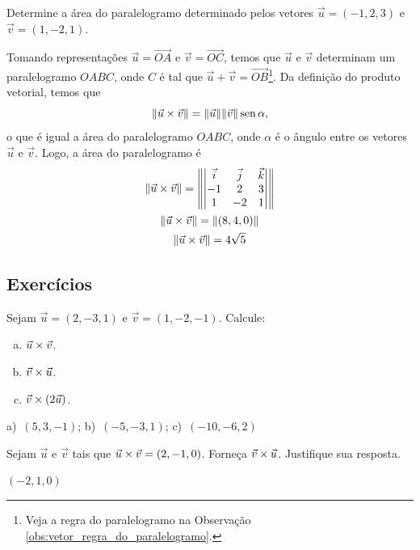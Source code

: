 \begin{exeresol}
  Determine a área do paralelogramo determinado pelos vetores $\vec{u} = (-1, 2, 3)$ e $\vec{v} = (1,-2,1)$.
\end{exeresol}
\begin{resol}
  Tomando representações $\vec{u}=\overrightarrow{OA}$ e $\vec{v}=\overrightarrow{OC}$, temos que $\vec{u}$ e $\vec{v}$ determinam um paralelogramo $OABC$, onde $C$ é tal que $\vec{u}+\vec{v}=\overrightarrow{OB}$\footnote{Veja a regra do paralelogramo na Observação \ref{obs:vetor_regra_do_paralelogramo}.}. Da definição do produto vetorial, temos que
  \begin{equation}
    \|\vec{u}\times\vec{v}\| = \|\vec{u}\|\|\vec{v}\|\operatorname{sen}\alpha,
  \end{equation}
  o que é igual a área do paralelogramo $OABC$, onde $\alpha$ é o ângulo entre os vetores $\vec{u}$ e $\vec{v}$. Logo, a área do paralelogramo é
  \begin{gather}
    \|\vec{u}\times\vec{v}\| =
    \left\|\begin{vmatrix}
      \vec{i} & \vec{j} & \vec{k} \\
      -1 & 2 & 3 \\
      1 & -2 & 1
    \end{vmatrix}\right\|\\
    \|\vec{u}\times\vec{v}\| = \|(8,4,0)\|\\
    \|\vec{u}\times\vec{v}\| = 4\sqrt{5}
  \end{gather}
\end{resol}

\subsection{Exercícios}

\begin{exer}
  Sejam $\vec{u}=(2,-3,1)$ e $\vec{v}=(1,-2,-1)$. Calcule:
  \begin{enumerate}[a)]
  \item $\vec{u}\times\vec{v}$.
  \item $\vec{v}\times\vec{u}$.
  \item $\vec{v}\times(2\vec{u})$.
  \end{enumerate}
\end{exer}
\begin{resp}
  a)~$(5,3,-1)$; b)~$(-5,-3,1)$; c)~$(-10,-6,2)$
\end{resp}

\begin{exer}
  Sejam $\vec{u}$ e $\vec{v}$ tais que $\vec{u}\times\vec{v}=(2,-1,0)$. Forneça $\vec{v}\times\vec{u}$. Justifique sua resposta.
\end{exer}
\begin{resp}
  $(-2,1,0)$
\end{resp}

